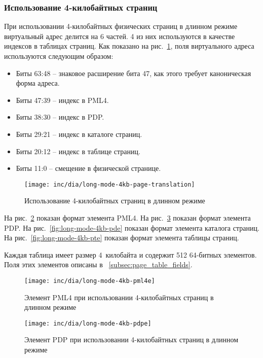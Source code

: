 \subsubsection*{Использование 4-килобайтных страниц}
При использовании 4-килобайтных физических страниц в длинном режиме виртуальный адрес делится на 6 частей.
4 из них используются в качестве индексов в таблицах страниц. Как показано на рис.~\ref{fig:long-mode-4kb-page-translation},
поля виртуального адреса используются следующим образом:
\begin{itemize}
\item Биты 63:48 -- знаковое расширение бита 47, как этого требует каноническая форма адреса.
\item Биты 47:39 -- индекс в PML4.
\item Биты 38:30 -- индекс в PDP.
\item Биты 29:21 -- индекс в каталоге страниц.
\item Биты 20:12 -- индекс в таблице страниц.
\item Биты 11:0 -- смещение в физической странице.
\end{itemize}

\begin{figure}[ht!]
  \centering
  \texttt{[image: inc/dia/long-mode-4kb-page-translation]}
  \caption{Использование 4-килобайтных страниц в длинном режиме}
  \label{fig:long-mode-4kb-page-translation}
\end{figure}

На рис.~\ref{fig:long-mode-4kb-pml4e} показан формат элемента PML4.
На рис.~\ref{fig:long-mode-4kb-pdpe} показан формат элемента PDP.
На рис.~\ref{fig:long-mode-4kb-pde} показан формат элемента каталога страниц.
На рис.~\ref{fig:long-mode-4kb-pte} показан формат элемента таблицы страниц.

Каждая таблица имеет размер 4~килобайта и содержит 512 64-битных элементов. Поля этих элементов
описаны в ~\ref{subsec:page_table_fields}.

\begin{figure}[ht!]
  \centering
  \texttt{[image: inc/dia/long-mode-4kb-pml4e]}
  \caption{Элемент PML4 при использовании 4-килобайтных страниц в длинном режиме}
  \label{fig:long-mode-4kb-pml4e}
\end{figure}

\begin{figure}[ht!]
  \centering
  \texttt{[image: inc/dia/long-mode-4kb-pdpe]}
  \caption{Элемент PDP при использовании 4-килобайтных страниц в длинном режиме}
  \label{fig:long-mode-4kb-pdpe}
\end{figure}

